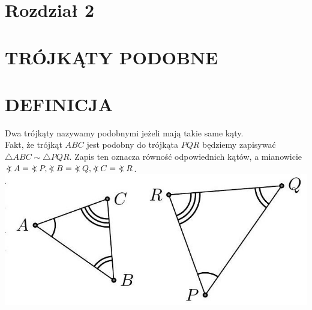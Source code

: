 \documentclass[10pt]{article}
\newcommand\Varangle{\mathop{{<\!\!\!\!\!\text{\small)}}\:}\nolimits}
\begin{document}
\section*{Rozdział 2}
\section*{TRÓJKĄTY PODOBNE}
\section*{DEFINICJA}
Dwa trójkąty nazywamy podobnymi jeżeli mają takie same kąty.\\
Fakt, że trójkąt \(A B C\) jest podobny do trójkąta \(P Q R\) będziemy zapisywać \(\triangle A B C \sim \triangle P Q R\). Zapis ten oznacza równość odpowiednich kątów, a mianowicie\\
\(\Varangle A=\Varangle P, \Varangle B=\Varangle Q, \Varangle C=\Varangle R\).\\
\includegraphics[max width=\textwidth, center]{2024_11_21_e9b4faa005d5be2cc318g-021}
\end{document}
